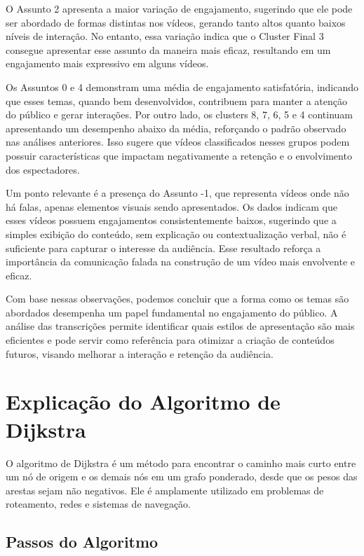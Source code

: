 \documentclass[manuscript,screen,review]{acmart}
\begin{document}
O Assunto 2 apresenta a maior variação de engajamento, sugerindo que ele pode ser abordado de formas distintas nos vídeos, gerando tanto altos quanto baixos níveis de interação. No entanto, essa variação indica que o Cluster Final 3 consegue apresentar esse assunto da maneira mais eficaz, resultando em um engajamento mais expressivo em alguns vídeos.

Os Assuntos 0 e 4 demonstram uma média de engajamento satisfatória, indicando que esses temas, quando bem desenvolvidos, contribuem para manter a atenção do público e gerar interações. Por outro lado, os clusters 8, 7, 6, 5 e 4 continuam apresentando um desempenho abaixo da média, reforçando o padrão observado nas análises anteriores. Isso sugere que vídeos classificados nesses grupos podem possuir características que impactam negativamente a retenção e o envolvimento dos espectadores.

Um ponto relevante é a presença do Assunto -1, que representa vídeos onde não há falas, apenas elementos visuais sendo apresentados. Os dados indicam que esses vídeos possuem engajamentos consistentemente baixos, sugerindo que a simples exibição do conteúdo, sem explicação ou contextualização verbal, não é suficiente para capturar o interesse da audiência. Esse resultado reforça a importância da comunicação falada na construção de um vídeo mais envolvente e eficaz.

Com base nessas observações, podemos concluir que a forma como os temas são abordados desempenha um papel fundamental no engajamento do público. A análise das transcrições permite identificar quais estilos de apresentação são mais eficientes e pode servir como referência para otimizar a criação de conteúdos futuros, visando melhorar a interação e retenção da audiência.

\section{Explicação do Algoritmo de Dijkstra}

O algoritmo de Dijkstra é um método para encontrar o caminho mais curto entre um nó de origem e os demais nós em um grafo ponderado, desde que os pesos das arestas sejam não negativos. Ele é amplamente utilizado em problemas de roteamento, redes e sistemas de navegação.

\subsection{Passos do Algoritmo}
\end{document}

